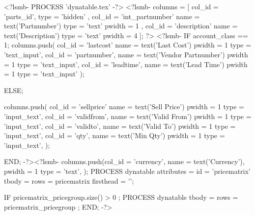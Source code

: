 \documentclass[a4paper]{article}
\begin{document}
<?lsmb- PROCESS 'dynatable.tex' -?>
<?lsmb-
    columns = [ 
              { col_id = 'parts_id',
                  type = 'hidden' },
              { col_id = 'int_partnumber'
                  name = text('Partnumber')
                  type = 'text'
                pwidth = 1
                },
                { col_id = 'description'
                  name = text('Description')
                  type = 'text'
                pwidth = 4
                } ];
?> <?lsmb-
     IF account_class == 1;
         columns.push(
                  {col_id = 'lastcost'
                     name = text('Last Cost') 
                   pwidth = 1
                     type = 'text_input'},
                  {col_id = 'partnumber',
                     name = text('Vendor Partnumber') 
                   pwidth = 1
                     type = 'text_input'},
                  {col_id = 'leadtime',
                     name = text('Lead Time') 
                   pwidth = 1
                     type = 'text_input'}
         );

     ELSE;

         columns.push(
                  {col_id = 'sellprice'
                     name = text('Sell Price') 
                   pwidth = 1
                     type = 'input_text'},
                  {col_id = 'validfrom',
                     name = text('Valid From') 
                   pwidth = 1
                     type = 'input_text'},
                  {col_id = 'validto',
                     name = text('Valid To') 
                   pwidth = 1
                     type = 'input_text'},
                  {col_id = 'qty',
                     name = text('Min Qty') 
                   pwidth = 1
                     type = 'input_text'},
         );
                        
     END;
-?><?lsmb-
     columns.push({col_id = 'currency',
                     name = text('Currency'),
                   pwidth = 1
                     type = 'text'},
     );
      PROCESS dynatable
    attributes = { id = 'pricematrix' }
         tbody = { rows = pricematrix }
    firsthead = '';

   IF pricematrix_pricegroup.size() > 0 ;
     PROCESS dynatable
         tbody = { rows = pricematrix_pricegroup };
   END;
-?>
\end{document}
